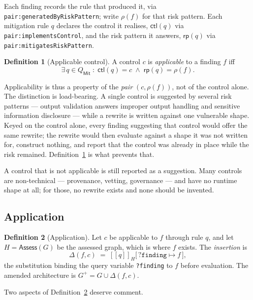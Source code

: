 \documentclass[11pt,a4paper]{article}
\theoremstyle{definition}
\newtheorem{definition}{Definition}
\theoremstyle{plain}
\newcommand{\Arch}{G}
\newcommand{\Assess}{\mathsf{Assess}}
\newcommand{\eval}[2]{[\![#1]\!]_{#2}}
\begin{document}
Each finding records the rule that produced it, via
\texttt{pair:\allowbreak generatedByRiskPattern}; write $\rho(f)$ for that risk
pattern. Each mitigation rule $q$ declares the control it realises,
$\mathsf{ctl}(q)$ via \texttt{pair:implementsControl}, and the risk pattern it
answers, $\mathsf{rp}(q)$ via \texttt{pair:mitigatesRiskPattern}.

\begin{definition}[Applicable control]
\label{def:applicable}
A control $c$ is \emph{applicable} to a finding $f$ iff
\[
  \exists\, q \in Q_{\mathsf{Mit}} \; : \;
  \mathsf{ctl}(q) = c \;\wedge\; \mathsf{rp}(q) = \rho(f).
\]
\end{definition}

Applicability is thus a property of the \emph{pair} $(c, \rho(f))$, not of the
control alone. The distinction is load-bearing. A single control is suggested by
several risk patterns --- output validation answers improper output handling and
sensitive information disclosure --- while a rewrite is written against one
vulnerable shape. Keyed on the control alone, every finding suggesting that
control would offer the same rewrite; the rewrite would then evaluate against a
shape it was not written for, construct nothing, and report that the control was
already in place while the risk remained. Definition~\ref{def:applicable} is what
prevents that.

A control that is not applicable is still reported as a suggestion. Many
controls are non-technical --- provenance, vetting, governance --- and have no
runtime shape at all; for those, no rewrite exists and none should be invented.

\subsection{Application}

\begin{definition}[Application]
\label{def:apply}
Let $c$ be applicable to $f$ through rule $q$, and let
$H = \Assess(\Arch)$ be the assessed graph, which is where $f$ exists. The
\emph{insertion} is
\[
  \Delta(f, c) \;=\; \eval{q}{H}\big[\, \mathtt{?finding} \mapsto f \,\big],
\]
the substitution binding the query variable \texttt{?finding} to $f$ before
evaluation. The amended architecture is $\Arch^{+} = \Arch \cup \Delta(f,c)$.
\end{definition}

Two aspects of Definition~\ref{def:apply} deserve comment.
\end{document}
